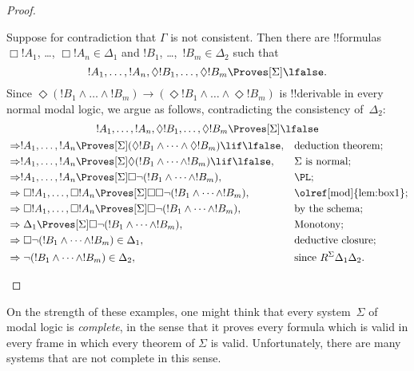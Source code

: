 \documentclass[../../../include/open-logic-section]{subfiles}
\begin{document}
\begin{proof}
\begin{enumerate}
    Suppose for contradiction that $\Gamma$ is not consistent. Then
    there are !!{formula}s $\Box!A_1$, \dots, $\Box!A_n \in \Delta_1$
    and $!B_1$, \dots,~$!B_m \in \Delta_2$ such that \[!A_1, \dots,
    !A_n, \Diamond!B_1, \dots, \Diamond!B_m \Proves[\Sigma]
    \lfalse.\] Since $\Diamond (!B_1 \land \dots \land !B_m) \to
    (\Diamond!B_1 \land \dots \land \Diamond!B_m)$ is !!{derivable} in
    every normal modal logic, we argue as follows, contradicting the
    consistency of~$\Delta_2$:
    \begin{multline*}
      !A_1, \dots, !A_n, \Diamond!B_1, \dots,
      \Diamond!B_m\Proves[\Sigma] \lfalse \\
    \begin{aligned}
      & \Rightarrow
      !A_1, \dots,!A_n \Proves[\Sigma] (\Diamond!B_1 \land
      \dots \land \Diamond!B_m) \lif \lfalse,
      && \text{deduction theorem;} \\
      & \Rightarrow !A_1, \dots,!A_n \Proves[\Sigma]
      \Diamond(!B_1 \land
      \dots \land !B_m) \lif \lfalse, && \Sigma \text{ is normal}; \\
      & \Rightarrow !A_1, \dots,!A_n \Proves[\Sigma]
      \Box \lnot (!B_1 \land \dots \land !B_m), && \text{\PL}; \\
      & \Rightarrow \Box!A_1, \dots,\Box!A_n
      \Proves[\Sigma] \Box\Box \lnot (!B_1 \land \dots \land !B_m), &&
      \text{\olref[mod]{lem:box1}}; \\
      & \Rightarrow \Box!A_1, \dots,\Box!A_n
      \Proves[\Sigma]
      \Box\lnot (!B_1 \land \dots \land !B_m), && \text{by the
        schema}; \\
      & \Rightarrow \Delta_1 \Proves[\Sigma]
      \Box\lnot (!B_1 \land \dots \land !B_m), && \text{Monotony}; \\
      & \Rightarrow 
      \Box\lnot (!B_1 \land \dots \land !B_m) \in \Delta_1, && \text{deductive closure}; \\
      & \Rightarrow 
      \lnot (!B_1 \land \dots \land !B_m) \in \Delta_2, && \text{since }
      R^\Sigma \Delta_1\Delta_2. 
    \end{aligned}
    \end{multline*}\qedhere
  \end{enumerate}
\end{proof}

On the strength of these examples, one might think that every
system~$\Sigma$ of modal logic is \emph{complete}, in the sense that
it proves every formula which is valid in every frame in which every
theorem of $\Sigma$ is valid. Unfortunately, there are many systems
that are not complete in this sense.
\end{document}
